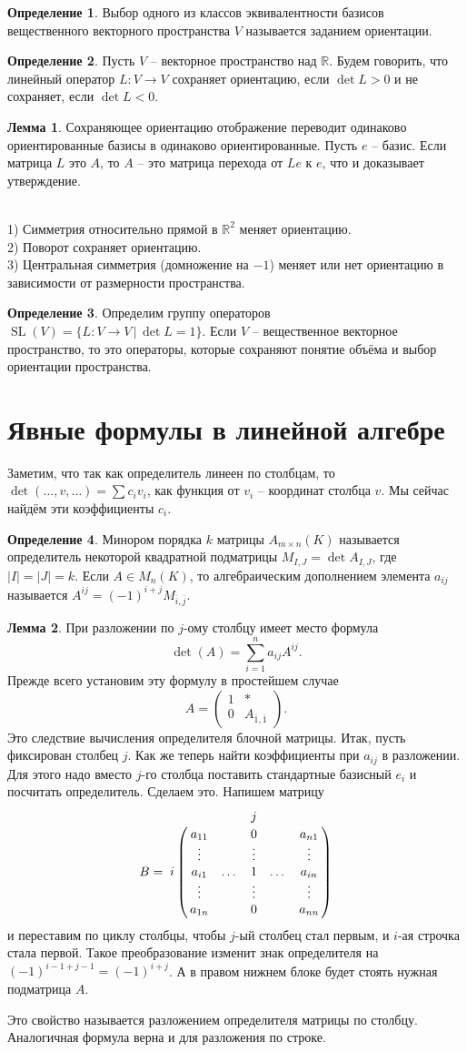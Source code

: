\documentclass[10pt,a4paper,oneside]{book}
\theoremstyle{definition}
\newtheorem*{defn}{Определение}
\newtheorem{lem}{Лемма}
\newcommand{\mb}[1]{\mathbb{#1}}
\newcommand{\ovl}{\overline}
\newcommand{\SL}{\operatorname{SL}}
\def\exm{\noindent {\bf Примеры:}}
\def\dfn{\begin{defn}}
\def\edfn{\end{defn}}
\def\lm{\begin{lem}}
\def\elm{\end{lem}}
\def\pmat{\begin{pmatrix}}
\def\epmat{\end{pmatrix}}
\begin{document}
\dfn Выбор одного из классов эквивалентности базисов вещественного векторного пространства $V$ называется заданием ориентации.
\edfn

\dfn Пусть $V$ -- векторное пространство над $\mb R$. Будем говорить, что линейный оператор $L\colon V \to V$ сохраняет ориентацию, если $\det L>0$ и не сохраняет, если $\det L<0$.
\edfn

\lm Сохраняющее ориентацию отображение переводит одинаково ориентированные базисы в одинаково ориентированные.
\proof Пусть $e$ -- базис. Если матрица $L$ это $A$, то $A$ -- это матрица перехода от $Le$ к $e$, что и доказывает утверждение.
\endproof
\elm

\exm\\
1) Симметрия относительно прямой в $\mb R^2$ меняет ориентацию.\\
2) Поворот сохраняет ориентацию.\\
3) Центральная симметрия (домножение на $-1$) меняет или нет ориентацию в зависимости от размерности пространства.


\dfn Определим группу операторов $\SL(V)=\{ L\colon V \to V \,|\, \det L=1\}$. Если $V$ -- вещественное векторное пространство, то это операторы, которые сохраняют понятие объёма и  выбор ориентации пространства.
\edfn



\section{Явные формулы в линейной алгебре}

Заметим, что так как определитель линеен по столбцам, то $\det (\dots,v,\dots)= \sum c_i v_i$, как функция от $v_i$ -- координат  столбца $v$. Мы сейчас найдём эти коэффициенты $c_i$.

\dfn Минором порядка $k$ матрицы $A_{m\times n}(K)$ называется определитель некоторой квадратной подматрицы $M_{I,J}=\det A_{I,J}$, где $|I|=|J|=k$. Если $A\in M_n(K)$, то алгебраическим дополнением элемента $a_{ij}$ называется $A^{ij}=(-1)^{i+j} M_{\ovl{i},\ovl{j}}$.
\edfn



\lm При разложении по $j$-ому столбцу имеет место формула  $$\det(A)=\sum_{i=1}^n a_{ij} A^{ij}.$$
\proof Прежде всего установим эту формулу в простейшем случае $$A=\pmat 1& *\\
0& A_{\ovl{1},\ovl{1}}\epmat. $$
Это следствие вычисления определителя блочной матрицы. Итак, пусть фиксирован столбец $j$. Как же теперь найти коэффициенты при $a_{ij}$ в разложении. Для этого надо вместо $j$-го столбца поставить стандартные базисный $e_i$ и посчитать определитель. Сделаем это. Напишем матрицу
$$B= \bordermatrix{
 & &       &  j &      & \cr
 & a_{11} && 0 &  & a_{n1}    \cr
 & \vdots& & \vdots& & \vdots\cr
 i &a_{i1}&\dots & 1 &\dots & a_{in} \cr
 & \vdots& & \vdots& & \vdots\cr
 & a_{1n} &  & 0 &      &a_{nn} } $$
и переставим по циклу столбцы, чтобы $j$-ый столбец стал первым, и $i$-ая строчка стала первой. Такое преобразование изменит знак определителя на $(-1)^{i-1+j-1}=(-1)^{i+j}$. А в правом нижнем блоке будет стоять нужная подматрица $A$.
\endproof
\elm
Это свойство называется разложением  определителя матрицы  по столбцу. Аналогичная формула верна и для разложения по строке.
\end{document}
